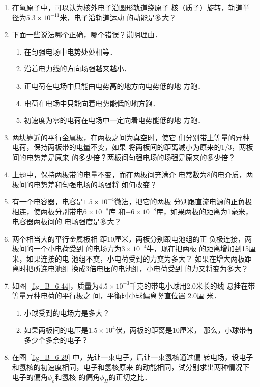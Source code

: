 \begin{enumerate}
\item 在氢原子中，可以认为核外电子沿圆形轨道绕原子
核（质子）旋转，轨道半径为$5.3\times10^{-11}$米，电子沿轨道运动
的动能是多大？
\item 下面一些说法哪个正确，哪个错误？说明理由．
\begin{enumerate}
\item 在匀强电场中电势处处相等．
\item 沿着电力线的方向场强越来越小．
\item 正电荷在电场中只能由电势高的地方向电势低的地
方跑．
\item 电荷在电场中只能向着电势能低的地方跑．
\item 初速度为零的电荷在电场中一定向着电势能低的地
方跑．
\end{enumerate}
\item 两块靠近的平行金属板，在两板之间为真空时，使它
们分别带上等量的异种电荷，保持两板带的电量不变，如果
将两板间的距离减小为原来的1/3，两板间的电势差是原来
的多少倍？两板间匀强电场的场强是原来的多少倍？
\item 上题中，保持两板带的电量不变，而在两板间充满介
电常数为8的电介质，两板间的电势差和匀强电场的场强将
如何改变？
\item 有一个电容器，电容是$1.5\times10^{-4}$微法，把它的两板
分别跟直流电源的正负极相连，使两板分别带电$6\times10^{-8}$库
和$-6\times10^{-8}$库，如果两板的距离为1毫米，电容器两板间的
电场强度是多大？
\item 两个相当大的平行金属板相
距10厘米，两板分别跟电池组的正
负极连接，两板间的一个小电荷受到
的电场力为$3\times10^{-4}$牛，现在把两板
的距离增加到15厘米，如果连接的电
池组不变，小电荷受到的力变为多大？
如果在增大两板距离时把所连电池组
换成3倍电压的电池组，小电荷受到
的力又将变为多大？



\item 如图~\ref{fig_B_6-44}，质量为$4.5\times
10^{-3}$千克的带电小球用2.0米长的线
悬挂在带等量异种电荷的平行板之
间，平衡时小球偏离竖直位置 2.0厘
米．
\begin{enumerate}
    \item 小球受到的电场力是多大？
    \item 如果两板间的电压是$1.5\times10^4$伏，两板的距离是10厘米，
那么，小球带有多少个多余的电子？
\end{enumerate}
    

\item 在图~\ref{fig_B_6-29} 中，先让一束电子，后让一束氢核通过偏
转电场，设电子和氢核的初速度相同，电子和氢核原来
的动能相同，试分别求出两种情况下电子的偏角$\phi_e$和氢核
的偏角$\phi_H$的正切之比．


\end{enumerate}
